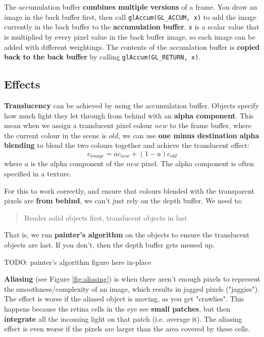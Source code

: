 \documentclass{article}
\begin{document}
The accumulation buffer \textbf{combines multiple versions} of a frame. You draw an image in the back buffer first, then call \texttt{glAccum(GL\_ACCUM, x)} to add the image currently in the back buffer to the \textbf{accumulation buffer}. \texttt{x} is a scalar value that is multiplied by every pixel value in the back buffer image, so each image can be added with different weightings. The contents of the accumlation buffer is \textbf{copied back to the back buffer} by calling \texttt{glAccum(GL\_RETURN, x)}.

\subsection{Effects}

\textbf{Translucency} can be achieved by using the accumulation buffer. Objects specify how much light they let through from behind with an \textbf{alpha component}. This mean when we assign a translucent pixel colour $new$ to the frame buffer, where the current colour in the scene is $old$, we can use \textbf{one minus destination alpha blending} to blend the two colours together and achieve the translucent effect:
\begin{equation}
	c_{image} = a c_{new} + (1 - a)c_{old}
\end{equation}
where $a$ is the alpha component of the $new$ pixel. The alpha component is often specified in a texture.

For this to work correctly, and ensure that colours blended with the transparent pixels are \textbf{from behind}, we can't just rely on the depth buffer. We need to:
\begin{quote}
	Render solid objects first, translucent objects in last
\end{quote}
That is, we run \textbf{painter's algorithm} on the objects to ensure the translucent objects are last. If you don't, then the depth buffer gets messed up. 

TODO: painter's algorithm figure here in-place

\textbf{Aliasing} (see Figure \ref{fig:aliasing}) is when there aren't enough pixels to represent the smoothness/complexity of an image, which results in jagged pixels ("jaggies"). The effect is worse if the aliased object is moving, as you get "crawlies". This happens because the retina cells in the eye see \textbf{small patches}, but then \textbf{integrate} all the incoming light on that patch (i.e. average it). The aliasing effect is even worse if the pixels are larger than the area covered by these cells.
\end{document}
